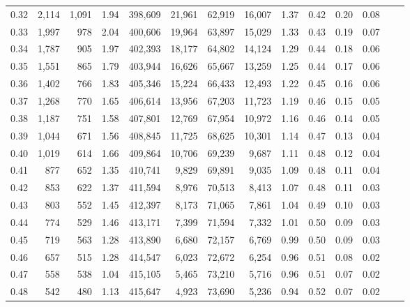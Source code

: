 \begin{tabular}{rrrrrrrrrrrrrr}
0.32 &   2,114 &  1,091 &    1.94 &  398,609 &   21,961 &  62,919 &  16,007 &  1.37 &  0.42 &  0.20 &      0.08 \\
0.33 &   1,997 &    978 &    2.04 &  400,606 &   19,964 &  63,897 &  15,029 &  1.33 &  0.43 &  0.19 &      0.07 \\
0.34 &   1,787 &    905 &    1.97 &  402,393 &   18,177 &  64,802 &  14,124 &  1.29 &  0.44 &  0.18 &      0.06 \\
0.35 &   1,551 &    865 &    1.79 &  403,944 &   16,626 &  65,667 &  13,259 &  1.25 &  0.44 &  0.17 &      0.06 \\
0.36 &   1,402 &    766 &    1.83 &  405,346 &   15,224 &  66,433 &  12,493 &  1.22 &  0.45 &  0.16 &      0.06 \\
0.37 &   1,268 &    770 &    1.65 &  406,614 &   13,956 &  67,203 &  11,723 &  1.19 &  0.46 &  0.15 &      0.05 \\
0.38 &   1,187 &    751 &    1.58 &  407,801 &   12,769 &  67,954 &  10,972 &  1.16 &  0.46 &  0.14 &      0.05 \\
0.39 &   1,044 &    671 &    1.56 &  408,845 &   11,725 &  68,625 &  10,301 &  1.14 &  0.47 &  0.13 &      0.04 \\
0.40 &   1,019 &    614 &    1.66 &  409,864 &   10,706 &  69,239 &   9,687 &  1.11 &  0.48 &  0.12 &      0.04 \\
0.41 &     877 &    652 &    1.35 &  410,741 &    9,829 &  69,891 &   9,035 &  1.09 &  0.48 &  0.11 &      0.04 \\
0.42 &     853 &    622 &    1.37 &  411,594 &    8,976 &  70,513 &   8,413 &  1.07 &  0.48 &  0.11 &      0.03 \\
0.43 &     803 &    552 &    1.45 &  412,397 &    8,173 &  71,065 &   7,861 &  1.04 &  0.49 &  0.10 &      0.03 \\
0.44 &     774 &    529 &    1.46 &  413,171 &    7,399 &  71,594 &   7,332 &  1.01 &  0.50 &  0.09 &      0.03 \\
0.45 &     719 &    563 &    1.28 &  413,890 &    6,680 &  72,157 &   6,769 &  0.99 &  0.50 &  0.09 &      0.03 \\
0.46 &     657 &    515 &    1.28 &  414,547 &    6,023 &  72,672 &   6,254 &  0.96 &  0.51 &  0.08 &      0.02 \\
0.47 &     558 &    538 &    1.04 &  415,105 &    5,465 &  73,210 &   5,716 &  0.96 &  0.51 &  0.07 &      0.02 \\
0.48 &     542 &    480 &    1.13 &  415,647 &    4,923 &  73,690 &   5,236 &  0.94 &  0.52 &  0.07 &      0.02 \\

\end{tabular}
